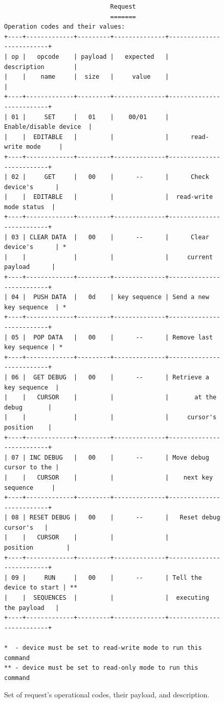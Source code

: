 \begin{figure}[ht]
\centering
\begin{varwidth}{\linewidth}
\begin{small}
\begin{verbatim}
                             Request
                             =======
Operation codes and their values:
+----+-------------+---------+--------------+--------------------------+
| op |   opcode    | payload |   expected   |       description        |
|    |    name     |  size   |     value    |                          |
+----+-------------+---------+--------------+--------------------------+
| 01 |     SET     |   01    |    00/01     |   Enable/disable device  |
|    |  EDITABLE   |         |              |      read-write mode     |
+----+-------------+---------+--------------+--------------------------+
| 02 |     GET     |   00    |      --      |      Check device's      |
|    |  EDITABLE   |         |              |  read-write mode status  |
+----+-------------+---------+--------------+--------------------------+
| 03 | CLEAR DATA  |   00    |      --      |      Clear device's      | *
|    |             |         |              |     current payload      |
+----+-------------+---------+--------------+--------------------------+
| 04 |  PUSH DATA  |   0d    | key sequence | Send a new key sequence  | *
+----+-------------+---------+--------------+--------------------------+
| 05 |  POP DATA   |   00    |      --      | Remove last key sequence | *
+----+-------------+---------+--------------+--------------------------+
| 06 |  GET DEBUG  |   00    |      --      | Retrieve a key sequence  |
|    |   CURSOR    |         |              |       at the debug       |
|    |             |         |              |     cursor's position    |
+----+-------------+---------+--------------+--------------------------+
| 07 | INC DEBUG   |   00    |      --      | Move debug cursor to the |
|    |   CURSOR    |         |              |    next key sequence     |
+----+-------------+---------+--------------+--------------------------+
| 08 | RESET DEBUG |   00    |      --      |   Reset debug cursor's   |
|    |   CURSOR    |         |              |         position         |
+----+-------------+---------+--------------+--------------------------+
| 09 |     RUN     |   00    |      --      | Tell the device to start | **
|    |  SEQUENCES  |         |              |  executing the payload   |
+----+-------------+---------+--------------+--------------------------+

*  - device must be set to read-write mode to run this command
** - device must be set to read-only mode to run this command
\end{verbatim}
\end{small}
\end{varwidth}
\caption{Set of request's operational codes, their payload, and description.}
\label{fig:communication_protocol_request}
\end{figure}

